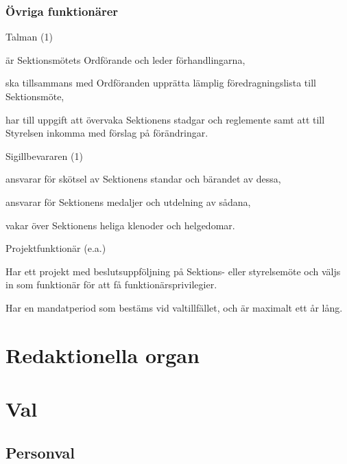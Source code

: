 \documentclass[10pt]{article}
\renewcommand{\thesubsection}{\arabic{section}:\Alph{subsection}}
\begin{document}
\subsubsection{Övriga funktionärer}
\begin{emptylist}
    \item Talman (1)
        \begin{dashlist}
            \item är Sektionsmötets Ordförande och leder förhandlingarna,
            \item ska tillsammans med Ordföranden upprätta lämplig
                föredragningslista till Sektionsmöte,
            \item har till uppgift att övervaka Sektionens stadgar och
                reglemente samt att till Styrelsen inkomma med förslag på
                förändringar.
        \end{dashlist}
    \item Sigillbevararen (1)
        \begin{dashlist}
            \item ansvarar för skötsel av Sektionens standar och bärandet av
                dessa,
            \item ansvarar för Sektionens medaljer och utdelning av sådana,
            \item vakar över Sektionens heliga klenoder och helgedomar.
        \end{dashlist}
    \item Projektfunktionär (e.a.)
    \begin{dashlist}
      \item Har ett projekt med beslutsuppföljning på Sektions- eller styrelsemöte och väljs in som funktionär för att få funktionärsprivilegier.
      \item Har en mandatperiod som bestäms vid valtillfället, och är maximalt ett år lång.
    \end{dashlist}
\end{emptylist}
\renewcommand*\thesubsection{\arabic{section}:\Alph{subsection}}
\section{Redaktionella organ}

\section{Val}

\subsection{Personval}
\end{document}
